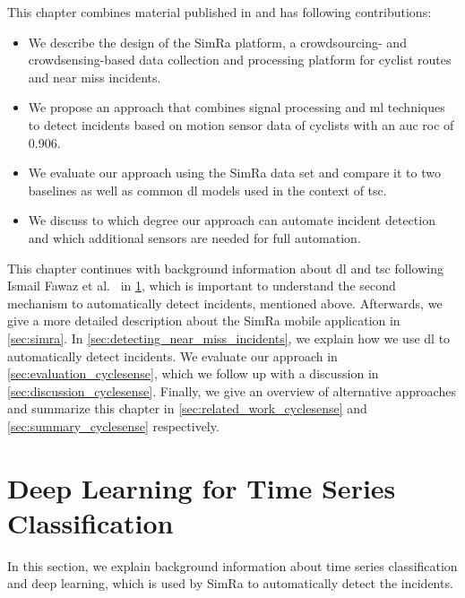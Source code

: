 This chapter combines material published in \cite{karakaya2020simra,karakaya2022cyclesense} and has following contributions:
\begin{itemize}
\item We describe the design of the SimRa platform, a crowdsourcing- and crowdsensing-based data collection and processing platform for cyclist routes and near miss incidents.
\item We propose an approach that combines signal processing and \ac{ml} techniques to detect incidents based on motion sensor data of cyclists with an \ac{auc} \ac{roc} of 0.906.
\item We evaluate our approach using the SimRa data set and compare it to two baselines as well as common \acl{dl} models used in the context of \acl{tsc}.
\item We discuss to which degree our approach can automate incident detection and which additional sensors are needed for full automation.
\end{itemize}

This chapter continues with background information about \ac{dl} and \ac{tsc} following Ismail Fawaz et al.~\cite{ismail2019deep} in \cref{sec:deep_learning_background}, which is important to understand the second mechanism to automatically detect incidents, mentioned above.
Afterwards, we give a more detailed description about the SimRa mobile application in \cref{sec:simra}.
In \cref{sec:detecting_near_miss_incidents}, we explain how we use \ac{dl} to automatically detect incidents.
We evaluate our approach in \cref{sec:evaluation_cyclesense}, which we follow up with a discussion in \cref{sec:discussion_cyclesense}.
Finally, we give an overview of alternative approaches and summarize this chapter in \cref{sec:related_work_cyclesense} and \cref{sec:summary_cyclesense} respectively.

\section{Deep Learning for Time Series Classification}
\label{sec:deep_learning_background}
In this section, we explain background information about time series classification and deep learning, which is used by SimRa to automatically detect the incidents.

